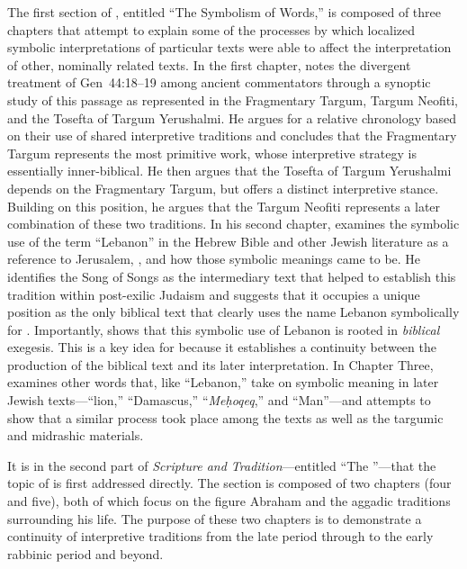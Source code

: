The first section of , entitled ``The Symbolism of Words,'' is composed of three chapters that attempt to explain some of the processes by which localized symbolic interpretations of particular texts were able to affect the interpretation of other, nominally related texts.
%
In the first chapter, \vermes notes the divergent treatment of Gen~44:18--19 among ancient commentators through a synoptic study of this passage as represented in the Fragmentary Targum, Targum Neofiti, and the Tosefta of Targum Yerushalmi. He argues for a relative chronology based on their use of shared interpretive traditions and concludes that the Fragmentary Targum represents the most primitive work, whose interpretive strategy is essentially inner-biblical. He then argues that the Tosefta of Targum Yerushalmi depends on the Fragmentary Targum, but offers a distinct interpretive stance. Building on this position, he argues that the Targum Neofiti represents a later combination of these two traditions.
%
In his second chapter, \vermes examines the symbolic use of the term ``Lebanon'' in the Hebrew Bible and other Jewish literature as a reference to Jerusalem, \thetemple, and how those symbolic meanings came to be. He identifies the Song of Songs as the intermediary text that helped to establish this tradition within post-exilic Judaism and suggests that it occupies a unique position as the only biblical text that clearly uses the name Lebanon symbolically for \thetemple. Importantly, \vermes shows that this symbolic use of Lebanon is rooted in \emph{biblical} exegesis. This is a key idea for \vermes because it establishes a continuity between the production of the biblical text and its later interpretation.
%
In Chapter Three, \vermes examines other words that, like ``Lebanon,'' take on symbolic meaning in later Jewish texts---``lion,'' ``Damascus,'' ``\emph{Meḥoqeq},'' and ``Man''---and attempts to show that a similar process took place among the \dss texts as well as the targumic and midrashic materials. 

It is in the second part of \emph{Scripture and Tradition}---entitled ``The \rwb''---that the topic of \rwb is first addressed directly. The section is composed of two chapters (four and five), both of which focus on the figure Abraham and the aggadic traditions surrounding his life. The purpose of these two chapters is to demonstrate a continuity of interpretive traditions from the late \secondtemple period through to the early rabbinic period and beyond. 

